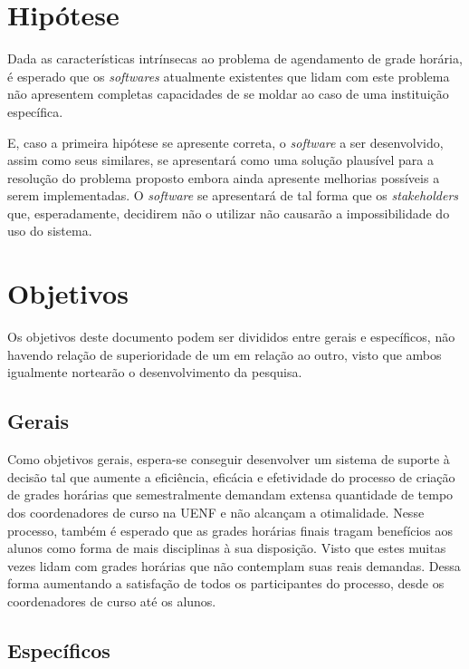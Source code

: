 \section{Hipótese} %

Dada as características intrínsecas ao problema de agendamento de grade horária, é esperado que os \textit{softwares} atualmente existentes que lidam com este problema não apresentem completas capacidades de se moldar ao caso de uma instituição específica.

E, caso a primeira hipótese se apresente correta, o \textit{software} a ser desenvolvido, assim como seus similares, se apresentará como uma solução plausível para a resolução do problema proposto embora ainda apresente melhorias possíveis a serem implementadas. O \textit{software} se apresentará de tal forma que os \textit{stakeholders} que, esperadamente, decidirem não o utilizar não causarão a impossibilidade do uso do sistema.

\section{Objetivos} %

Os objetivos deste documento podem ser divididos entre gerais e específicos, não havendo relação de superioridade de um em relação ao outro, visto que ambos igualmente nortearão o desenvolvimento da pesquisa.

\subsection{Gerais} %

Como objetivos gerais, espera-se conseguir desenvolver um sistema de suporte à decisão tal que aumente a eficiência, eficácia e efetividade do processo de criação de grades horárias que semestralmente demandam extensa quantidade de tempo dos coordenadores de curso na UENF e não alcançam a otimalidade. Nesse processo, também é esperado que as grades horárias finais tragam benefícios aos alunos como forma de mais disciplinas à sua disposição. Visto que estes muitas vezes lidam com grades horárias que não contemplam suas reais demandas. Dessa forma aumentando a satisfação de todos os participantes do processo, desde os coordenadores de curso até os alunos.

\subsection{Específicos} %

